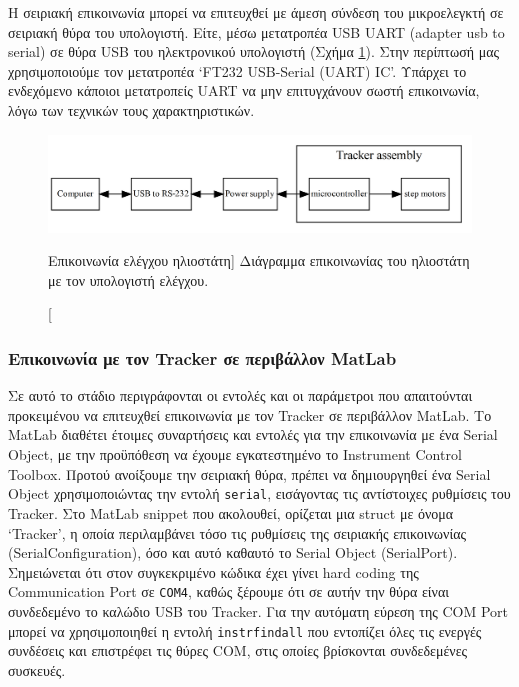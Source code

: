 \documentclass[
  a4paper,
  twoside,
  titlepage,
  11pt]{article}
\numberwithin{equation}{section}
\numberwithin{figure}{section}
\numberwithin{table}{section}
\begin{document}
Η σειριακή επικοινωνία μπορεί να επιτευχθεί με άμεση σύνδεση του μικροελεγκτή σε
σειριακή θύρα του υπολογιστή. Είτε, μέσω μετατροπέα USB UART (adapter usb to serial)
σε θύρα USB του ηλεκτρονικού υπολογιστή (Σχήμα \ref{fig:trackercon}). Στην περίπτωσή
μας χρησιμοποιούμε τον μετατροπέα `FT232 USB-Serial (UART) IC'. Υπάρχει το ενδεχόμενο
κάποιοι μετατροπείς UART να μην επιτυγχάνουν σωστή επικοινωνία, λόγω των τεχνικών
τους χαρακτηριστικών.

\begin{figure}[h!]
  \centering
     \includegraphics[width=.90\linewidth]{./figure/trackercon}
  \caption
  [Επικοινωνία ελέγχου ηλιοστάτη]
  {
    Διάγραμμα επικοινωνίας του ηλιοστάτη με τον υπολογιστή ελέγχου.
  }\label{fig:trackercon}
\end{figure}

\hypertarget{tracker_matlab}{%
\subsubsection{Επικοινωνία με τον Tracker σε περιβάλλον MatLab}\label{tracker_matlab}}

Σε αυτό το στάδιο περιγράφονται οι εντολές και οι παράμετροι που απαιτούνται
προκειμένου να επιτευχθεί επικοινωνία με τον Tracker σε περιβάλλον MatLab. Το MatLab
διαθέτει έτοιμες συναρτήσεις και εντολές για την επικοινωνία με ένα Serial Object, με
την προϋπόθεση να έχουμε εγκατεστημένο το Instrument Control Toolbox. Προτού
ανοίξουμε την σειριακή θύρα, πρέπει να δημιουργηθεί ένα Serial Object χρησιμοποιώντας
την εντολή \texttt{serial}, εισάγοντας τις αντίστοιχες ρυθμίσεις του Tracker. Στο MatLab
snippet που ακολουθεί, ορίζεται μια struct με όνομα `Tracker', η οποία περιλαμβάνει
τόσο τις ρυθμίσεις της σειριακής επικοινωνίας (SerialConfiguration), όσο και αυτό
καθαυτό το Serial Object (SerialPort). Σημειώνεται ότι στον συγκεκριμένο κώδικα έχει
γίνει hard coding της Communication Port σε \texttt{COM4}, καθώς ξέρουμε ότι σε αυτήν την
θύρα είναι συνδεδεμένο το καλώδιο USB του Tracker. Για την αυτόματη εύρεση της COM
Port μπορεί να χρησιμοποιηθεί η εντολή \texttt{instrfindall} που εντοπίζει όλες τις ενεργές
συνδέσεις και επιστρέφει τις θύρες COM, στις οποίες βρίσκονται συνδεδεμένες συσκευές.
\end{document}
